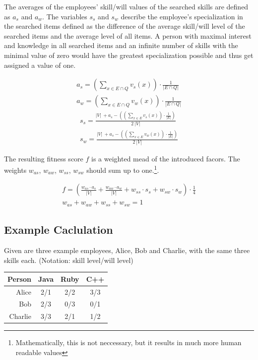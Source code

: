 The averages of the employees' skill/will values of the searched skills are defined as $a_s$ and $a_w$.
The variables $s_s$ and $s_w$ describe the employee's specialization in the searched items defined as the difference
of the average skill/will level of the searched items and the average level of all items.
A person with maximal interest and knowledge in all searched items and an infinite number of skills with the minimal
value of zero would have the greatest specialization possible and thus get assigned a value of one.

\begin{gather*}
  a_s = \left( \sum_{x \in E \cap Q} v_s(x) \right) \cdot \frac{1}{|E \cap Q|} \\
  a_w = \left( \sum_{x \in E \cap Q} v_w(x) \right) \cdot \frac{1}{|E \cap Q|}
\end{gather*}
\begin{gather*}
  s_s = \frac{|V| \ + a_s - \left( \left( \sum_{x \in E} v_s(x)\right) \cdot \frac{1}{|E|} \right)}{2 \ |V|}\\
  s_w = \frac{|V| \ + a_s - \left( \left( \sum_{x \in E} v_w(x)\right) \cdot \frac{1}{|E|} \right)}{2 \ |V|}
\end{gather*}

The resulting fitness score $f$ is a weighted mead of the introduced facors. The weights $w_{as}$, $w_{aw}$, $w_{ss}$, $w_{sw}$ should sum up to one.\footnote{Mathematically, this is not neccessary, but it results in much more human readable values}.

\begin{gather*}
  f = \left(\frac{w_{as} \cdot a_s}{|V|} + \frac{w_{aw} \cdot a_w}{|V|} + w_{ss} \cdot s_s + w_{sw} \cdot s_w \right) \cdot \frac{1}{4} \\
  w_{as} + w_{aw} + w_{ss} + w_{sw} = 1
\end{gather*}

\subsection{Example Caclulation}
Given are three example employees, Alice, Bob and Charlie, with the same three skills each.
(Notation: skill level/will level)
\newline
\newline
\begin{center}
\begin{tabular}{r|ccc}
  Person  & Java & Ruby & C++ \\
  \hline
  Alice   & 2/1  & 2/2 & 3/3 \\
  Bob     & 2/3  & 0/3 & 0/1 \\
  Charlie & 3/3  & 2/1 & 1/2 \\
\end{tabular}
\end{center}


